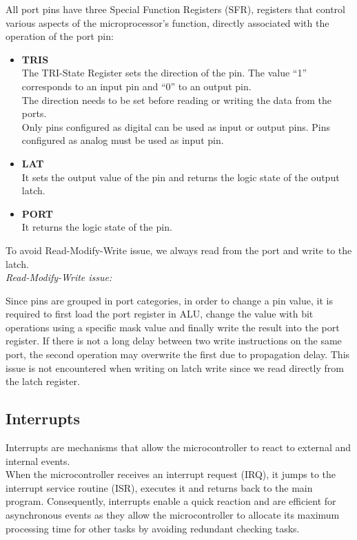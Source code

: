 \noindent
All port pins have three Special Function Registers (SFR), registers that control various aspects of the microprocessor's function, directly associated with the operation of the port pin:
\begin{itemize}
    \item \textbf{TRIS}\\
    The TRI-State Register sets the direction of the pin. The value ``1'' corresponds to an input pin and ``0'' to an output pin.\\
    The direction needs to be set before reading or writing the data from the ports. \\
    Only pins configured as digital can be used as input or output pins. Pins configured as analog must be used as input pin.
    \item \textbf{LAT}\\
    It sets the output value of the pin and returns the logic state of the output latch.
    \item \textbf{PORT}\\
    It returns the logic state of the pin. 
\end{itemize}
To avoid Read-Modify-Write issue, we always read from the port and write to the latch.\\

\noindent
\textit{Read-Modify-Write issue:}

\noindent
Since pins are grouped in port categories, in order to change a pin value, it is required to first load the port register in ALU, change the value with bit operations using a specific mask value and finally write the result into the port register. If there is not a long delay between two write instructions on the same port, the second operation may overwrite the first due to propagation delay. This issue is not encountered when writing on latch write since we read directly from the latch register. 

\subsection{Interrupts}

Interrupts are mechanisms that allow the microcontroller to react to external and internal events.\\
When the microcontroller receives an interrupt request (IRQ), it jumps to the interrupt service routine (ISR), executes it and returns back to the main program. 
Consequently, interrupts enable a quick reaction and are efficient for asynchronous events as they allow the microcontroller to allocate its maximum processing time for other tasks by avoiding redundant checking tasks.\\

